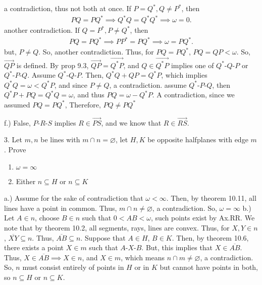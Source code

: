 \documentclass{report}
\begin{document}
    a contradiction, thus not both at once. If $P = Q^{*}, Q \ne P^{*}$, then
    \begin{align*}
        PQ = PQ^{*} \implies Q^{*}Q = Q^{*}Q^{*} \implies \omega = 0
    .\end{align*}
    another contradiction. If $Q = P^{*}, P \ne Q^{*}$, then
    \begin{align*}
        PQ = PQ^{*} \implies PP^{*} = PQ^{*} \implies \omega = PQ^{*}
    .\end{align*}
    but, $P \ne Q$. So, another contradiction. Thus, for $PQ = PQ^{*}$, $PQ = QP < \omega$. So, $\overrightarrow{QP}$ is defined. By prop 9.3, $\overrightarrow{QP} = \overrightarrow{Q^{*}P}$, and $Q \in \overrightarrow{Q^{*}P} $ implies one of $ Q^{*}\text{-}Q\text{-}P$ or $ Q^{*}\text{-}P\text{-}Q$. Assume $ Q^{*}\text{-}Q\text{-}P$. Then, $Q^{*}Q + QP = Q^{*}P $, which implies $ Q^{*}Q = \omega < Q^{*}P $, and since $P \ne Q$, a contradiction.
    \bigbreak \noindent 
    assume $ Q^{*}\text{-}P\text{-}Q$, then $ Q^{*}P + PQ = Q^{*}Q = \omega$, and thus $PQ = \omega - Q^{*}P$. A contradiction, since we assumed $PQ = PQ^{*}$, Therefore, $PQ \ne PQ^{*} $

    \bigbreak \noindent 
    f.) False, $ P\text{-}R\text{-}S$ implies $ R \in \overrightarrow{PS}$, and we know that $R \in \overrightarrow{RS}$.

    \pagebreak \bigbreak \noindent 
    \begin{mdframed}
        3. Let $m,n$ be lines with $m \cap n = \varnothing $, let $H,K$ be opposite halfplanes with edge $m$. Prove 
        \begin{enumerate}[label=(\alph*)]
            \item $\omega = \infty$
            \item Either $n \subseteq H$ or $n \subseteq K$
        \end{enumerate}
    \end{mdframed}
    \bigbreak \noindent 
    a.) Assume for the sake of contradiction that $\omega < \infty$. Then, by theorem 10.11, all lines have a point in common. Thus, $m \cap n \ne \varnothing$, a contradiction. So, $\omega = \infty $
    \bigbreak \noindent 
    b.) Let $A \in n$, choose $B \in n$ such that $0 < AB < \omega $, such points exist by Ax.RR. We note that by theorem 10.2, all segments, rays, lines are convex. Thus, for $X,Y \in n$, $\overline{XY} \subseteq n$. Thus, $\overline{AB} \subseteq n$. Suppose that $A \in H$, $B \in K$. Then, by theorem 10.6, there exists a point $X \in m$ such that $ A\text{-}X\text{-}B$. But, this implies that $X \in \overline{AB}$. Thus, $X \in \overline{AB} \implies X \in n$, and $X \in m$, which means $n \cap m \ne \varnothing$, a contradiction. 
    \bigbreak \noindent 
    So, $n$ must consist entirely of points in $H$ or in $K$ but cannot have points in both, so $n \subseteq H$ or $n \subseteq K$.
\end{document}
